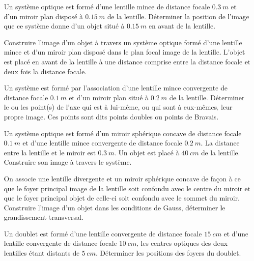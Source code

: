 %
\begin{exercice}%
Un système optique est formé d'une lentille mince de distance focale 
  \(\SI{0,3}{m}\) et d'un miroir plan disposé à \(\SI{0,15}{m}\) de la 
  lentille. Déterminer la position de l'image que ce système donne d'un objet 
  situé à \(\SI{0,15}{m}\) en avant de la lentille.
\end{exercice}%
%
\begin{exercice}%
Construire l'image d'un objet à travers un système optique formé d'une lentille 
  mince et d'un miroir plan disposé dans le plan focal image de la lentille. 
  L'objet est placé en avant de la lentille à une distance comprise entre la 
  distance focale et deux fois la distance focale.
\end{exercice}%
%
\begin{exercice}%
Un système est formé par l'association d'une lentille mince convergente de 
  distance focale \(\SI{0,1}{m}\) et d'un miroir plan situé à \(\SI{0,2}{m}\) 
  de la lentille. Déterminer le ou les point(s) de l'axe qui est à lui-même, ou 
  qui sont à eux-mêmes, leur propre image. Ces points sont dits points doubles 
  ou points de Bravais.
\end{exercice}%
%
\begin{exercice}%
Un système optique est formé d'un miroir sphérique concave de distance focale 
  \(\SI{0,1}{m}\) et d'une lentille mince convergente de distance focale 
  \(\SI{0,2}{m}\). La distance entre la lentille et le miroir est 
  \(\SI{0,3}{m}\). Un objet est placé à \(\SI{40}{cm}\) de la lentille. 
  Construire son image à travers le système.
\end{exercice}%
%
\begin{exercice}%
On associe une lentille divergente et un miroir sphérique concave de façon à ce 
  que le foyer principal image de la lentille soit confondu avec le centre du 
  miroir et que le foyer principal objet de celle-ci soit confondu avec le 
  sommet du miroir. Construire l'image d'un objet dans les conditions de Gauss, 
  déterminer le grandissement transversal.
\end{exercice}%
%
\begin{exercice}%
Un doublet est formé d'une lentille convergente de distance focale 
  \(\SI{15}{cm}\) et d'une lentille convergente de distance focale 
  \(\SI{10}{cm}\), les centres optiques des deux lentilles étant distants de 
  \(\SI{5}{cm}\). Déterminer les positions des foyers du doublet.
\end{exercice}%
